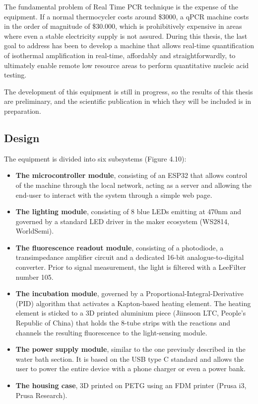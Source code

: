 The fundamental problem of Real Time PCR technique is the expense of the equipment. If a normal thermocycler costs around \$3000, a qPCR machine costs in the order of magnitude of \$30.000, which is prohibitively expensive in areas where even a stable electricity supply is not assured. During this thesis, the last goal to address has been to develop a machine that allows real-time quantification of isothermal amplification in real-time, affordably and straightforwardly, to ultimately enable remote low resource areas to perform quantitative nucleic acid testing. 

The development of this equipment is still in progress, so the results of this thesis are preliminary, and the scientific publication in which they will be included is in preparation. 


\subsection{Design}

The equipment is divided into six subsystems (Figure 4.10):

\begin{itemize}
\item \textbf{The microcontroller module}, consisting of an ESP32 that allows control of the machine through the local network, acting as a server and allowing the end-user to interact with the system through a simple web page. 
\item \textbf{The lighting module}, consisting of 8 blue LEDs emitting at 470nm and governed by a standard LED driver in the maker ecosystem (WS2814, WorldSemi).
\item \textbf{The fluorescence readout module}, consisting of a photodiode, a transimpedance amplifier circuit and a dedicated 16-bit analogue-to-digital converter. Prior to signal measurement, the light is filtered with a LeeFilter number 105. 
\item \textbf{The incubation module}, governed by a Proportional-Integral-Derivative (PID) algorithm that activates a Kapton-based heating element. The heating element is sticked to a 3D printed aluminium piece (Jiinsoon LTC, People's Republic of China) that holds the 8-tube strips with the reactions and channels the resulting fluorescence to the light-sensing module.
\item \textbf{The power supply module}, similar to the one previusly described in the water bath section. It is based on the USB type C standard and allows the user to power the entire device with a phone charger or even a power bank.
\item \textbf{The housing case}, 3D printed on PETG using an FDM printer (Prusa i3, Prusa Research).
\end{itemize}

